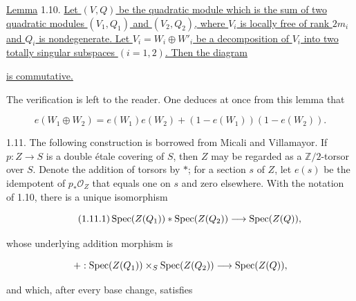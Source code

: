 \underline{Lemma} 1.10. \underline{Let $(V,Q)$ be the quadratic module
which is the sum of two quadratic modules $(V_1,Q_1)$ and $(V_2,Q_2)$,
where $V_i$ is locally free of rank $2m_i$ and $Q_i$ is nondegenerate.
Let $V_i=W_i\oplus W'_i$ be a decomposition of $V_i$ into two totally
singular subspaces $(i=1,2)$.  Then the diagram}

\begin{center}
\end{center}

\underline{is commutative.}


The verification is left to the reader.  One deduces at once from this
lemma that

\begin{equation}\tag{1.10.1}
e(W_1\oplus W_2)
=e(W_1)e(W_2)+(1-e(W_1))(1-e(W_2)).
\end{equation}

1.11. The following construction is borrowed from Micali and Villamayor.
If $p:Z\longrightarrow S$ is a double étale covering of $S$, then $Z$ may
be regarded as a $\mathbb Z/2$-torsor over $S$.  Denote the addition of
torsors by $*$; for a section $s$ of $Z$, let $e(s)$ be the idempotent of
$p_*\mathcal O_Z$ that equals one on $s$ and zero elsewhere.  With the
notation of 1.10, there is a unique isomorphism

\begin{equation}\tag{1.11.1}
\operatorname{Spec}(Z(Q_1))*\operatorname{Spec}(Z(Q_2))\longrightarrow\operatorname{Spec}(Z(Q)),
\end{equation}

whose underlying addition morphism is

\begin{equation*}
+:\operatorname{Spec}(Z(Q_1))\times_S\operatorname{Spec}(Z(Q_2))
\longrightarrow\operatorname{Spec}(Z(Q)),
\end{equation*}

and which, after every base change, satisfies

